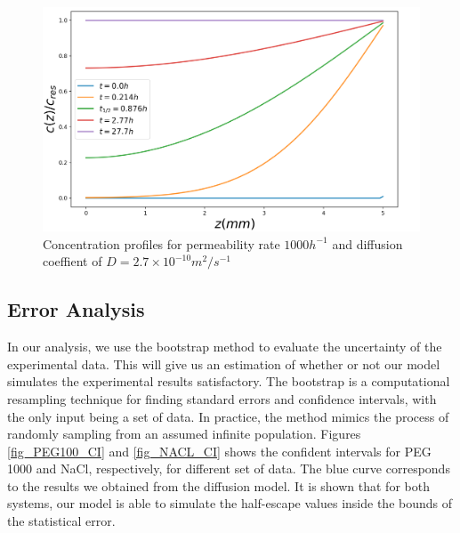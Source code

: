 \documentclass[11ptm,oneside,a4paper]{report}
\begin{document}
    \begin{figure}[!htb]
      \begin{center}
          \includegraphics[scale=0.25]{figures/SALT_conc_profiles.png}
          \caption{Concentration profiles for permeability rate $1{}000 h^{-1}$ and diffusion coeffient of $D = 2.7 \times 10^{-10} m^2/s^{-1}$ \label{conce_prof_NaCl_multi}}  
      \end{center} 
    \end{figure}

\subsection*{Error Analysis}

In our analysis, we use the bootstrap method to evaluate the uncertainty of the experimental data. This will give us an estimation of whether or not our model simulates the experimental results satisfactory. The bootstrap is a computational resampling technique for finding standard errors and confidence intervals, with the only input being a set of data. In
practice, the method mimics the process of randomly sampling from an assumed infinite population. Figures \ref{fig_PEG100_CI} and \ref{fig_NACL_CI} shows the confident intervals
for PEG 1000 and NaCl, respectively, for different set of data. The blue curve corresponds to
the results we obtained from the diffusion model. It is shown that for both systems, our model is able to simulate the half-escape values inside the bounds of the statistical error. 
\end{document}
